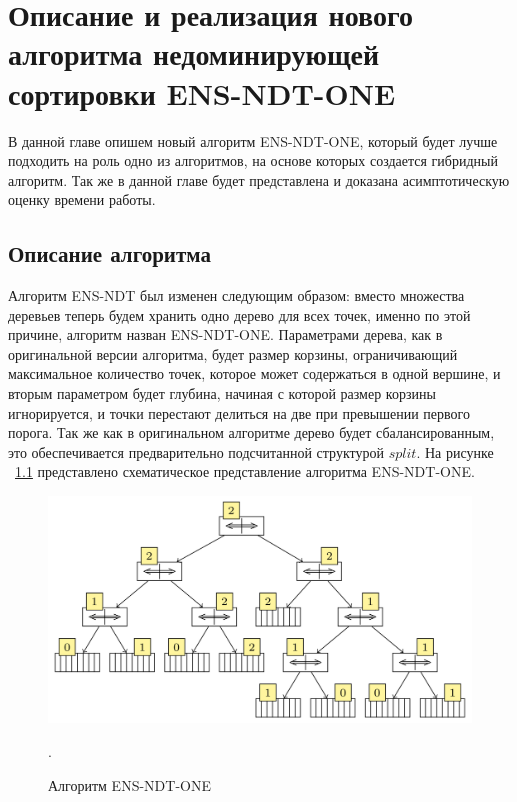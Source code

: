 \chapter{Описание и реализация нового алгоритма недоминирующей сортировки ENS-NDT-ONE}
\label{chapter3}

В данной главе опишем новый алгоритм ENS-NDT-ONE, который будет лучше подходить на роль одно из алгоритмов, на основе которых создается гибридный алгоритм. Так же в данной главе будет представлена и доказана асимптотическую оценку времени работы.

\section{Описание алгоритма}

Алгоритм ENS-NDT был изменен следующим образом: вместо множества деревьев теперь будем хранить одно дерево для всех точек, именно по этой причине, алгоритм назван ENS-NDT-ONE. Параметрами дерева, как в оригинальной версии алгоритма, будет размер корзины, ограничивающий максимальное количество точек, которое может содержаться в одной вершине, и вторым параметром будет глубина, начиная с которой размер корзины игнорируется, и точки перестают делиться на две при превышении первого порога. Так же как в оригинальном алгоритме дерево будет сбалансированным, это обеспечивается предварительно подсчитанной структурой $split$. На рисунке ~\ref{ndtree_new} представлено схематическое представление алгоритма ENS-NDT-ONE.

\begin{figure}[!h]
\begin{center}
\includegraphics[width=15cm]{pic/ndtree_new.png}
\caption{Алгоритм ENS-NDT-ONE}.
\label{ndtree_new}
\end{center}
\end{figure}

